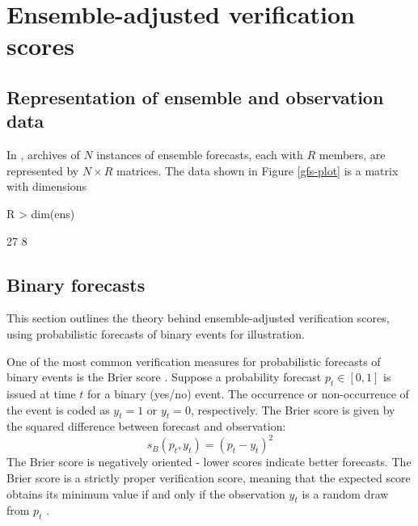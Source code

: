 \documentclass[article]{jss}
\begin{document}
\section{Ensemble-adjusted verification scores}

\subsection{Representation of ensemble and observation data}

In , archives of $N$ instances of ensemble forecasts, each with $R$ members, are represented by $N\times R$ matrices.
The data shown in Figure \ref{gfs-plot} is a matrix with dimensions

\begin{Schunk}
\begin{Sinput}
R > dim(ens)
\end{Sinput}
\begin{Soutput}
[1] 27  8
\end{Soutput}
\end{Schunk}


\subsection{Binary forecasts}

This section outlines the theory behind ensemble-adjusted verification scores, using probabilistic forecasts of binary events for illustration.  

One of the most common verification measures for probabilistic forecasts of binary events is the Brier score \citep{brier1950verification}.
Suppose a probability forecast $p_t \in [0,1]$ is issued at time $t$ for a binary (yes/no) event.
The occurrence or non-occurrence of the event is coded as $y_t=1$ or $y_t=0$, respectively. 
The Brier score is given by the squared difference between forecast and observation:
%
\begin{equation}
s_{B}(p_t, y_t) = (p_t - y_t)^2
\end{equation}
%
The Brier score is negatively oriented - lower scores indicate better forecasts.
The Brier score is a strictly proper verification score, meaning that the expected score obtains its minimum value if and only if the observation $y_t$ is a random draw from $p_t$ \citep{gneiting2007strictly}.
\end{document}
